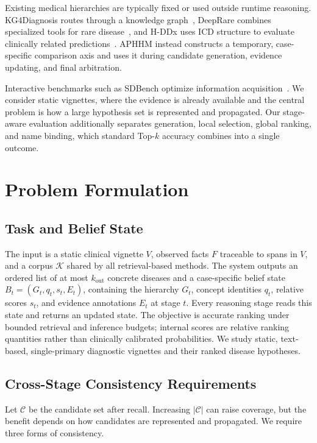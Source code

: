 \documentclass[letterpaper]{article} %
\begin{document}
Existing medical hierarchies are typically fixed or used outside runtime reasoning.
KG4Diagnosis routes through a knowledge graph~\cite{kg4diagnosis}, DeepRare combines specialized tools for rare disease~\cite{deeprare2025}, and H-DDx uses ICD structure to evaluate clinically related predictions~\cite{hddx2025}.
APHHM instead constructs a temporary, case-specific comparison axis and uses it during candidate generation, evidence updating, and final arbitration.

Interactive benchmarks such as SDBench optimize information acquisition~\cite{sdbench2025}.
We consider static vignettes, where the evidence is already available and the central problem is how a large hypothesis set is represented and propagated.
Our stage-aware evaluation additionally separates generation, local selection, global ranking, and name binding, which standard Top-$k$ accuracy combines into a single outcome.

\section{Problem Formulation}
\label{sec:problem}

\subsection{Task and Belief State}
\label{sec:task}

The input is a static clinical vignette $V$, observed facts $F$ traceable to spans in $V$, and a corpus $\mathcal{K}$ shared by all retrieval-based methods.
The system outputs an ordered list of at most $k_{\mathrm{out}}$ concrete diseases and a case-specific belief state
$B_t=(G_t,q_t,s_t,E_t)$, containing the hierarchy $G_t$, concept identities $q_t$, relative scores $s_t$, and evidence annotations $E_t$ at stage $t$.
Every reasoning stage reads this state and returns an updated state.
The objective is accurate ranking under bounded retrieval and inference budgets; internal scores are relative ranking quantities rather than clinically calibrated probabilities.
We study static, text-based, single-primary diagnostic vignettes and their ranked disease hypotheses.

\subsection{Cross-Stage Consistency Requirements}
\label{sec:dilemma}

Let $\mathcal{C}$ be the candidate set after recall.
Increasing $|\mathcal{C}|$ can raise coverage, but the benefit depends on how candidates are represented and propagated.
We require three forms of consistency.
\end{document}
